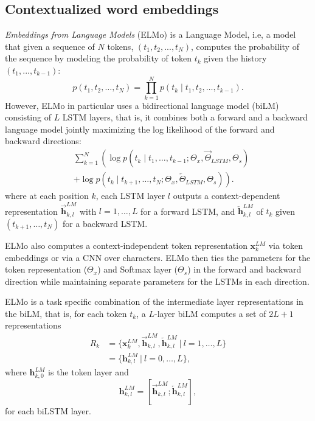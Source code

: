
\subsection{Contextualized word embeddings}

\emph{Embeddings from Language Models} (ELMo) \cite{peters-etal-2018-deep} is a Language Model, i.e, a model that given a sequence of $N$ tokens, $(t_1, t_2, ..., t_N)$, computes the probability of the sequence
by modeling the probability of token $t_k$ given the history $(t_1, ..., t_{k-1})$:
\[
    p(t_1, t_2, \ldots, t_N) = \prod_{k=1}^N p({t_k} \mid t_1, t_2, \ldots, t_{k-1}).
\]
However, ELMo in particular uses a bidirectional language model (biLM) consisting of $L$ LSTM layers, that is, it combines both a forward and a backward language model jointly maximizing the log likelihood of the forward and backward directions:
\begin{align*}
     & \sum_{k=1}^N \left( \right. \log p({t_k} \mid t_1, \ldots, t_{k-1}; \Theta_x, \overrightarrow{\Theta}_{LSTM}, \Theta_s) \\
     & + \log p({t_k} \mid t_{k+1}, \ldots, t_{N}; \Theta_x, \overleftarrow{\Theta}_{LSTM}, \Theta_s)
    \left. \right).
\end{align*}
where at each position $k$, each LSTM layer $l$ outputs a context-dependent representation $\overrightarrow{\mathbf{h}}^{LM}_{k,l}$ with $l=1, \ldots, L$ for a forward LSTM, and $\overleftarrow{\mathbf{h}}^{LM}_{k,l}$ of $t_k$ given $(t_{k+1}, \ldots, t_N)$ for a backward LSTM.

ELMo also computes a context-independent token representation $\mathbf{x}^{LM}_{k}$ via token embeddings or via a CNN over characters. ELMo then ties the parameters for the token representation ($\Theta_x$) and Softmax layer ($\Theta_s$) in the forward and backward direction while maintaining separate parameters for the LSTMs in each direction.

ELMo is a task specific combination of the intermediate layer representations in the biLM, that is,
for each token $t_k$, a $L$-layer biLM computes a set of $2L + 1$ representations
\begin{align*}
    R_k & =  \{\mathbf{x}^{LM}_{k}, \overrightarrow{\mathbf{h}}^{LM}_{k,l}, \overleftarrow{\mathbf{h}}^{LM}_{k,l} \ |\  l =1, \ldots, L \} \\
        & =  \{\mathbf{h}^{LM}_{k,l}\ | \ l=0, \ldots, L\},
\end{align*}
where $\mathbf{h}^{LM}_{k,0}$ is the token layer and
\[
    \mathbf{h}^{LM}_{k,l} = [\overrightarrow{\mathbf{h}}^{LM}_{k,l}; \overleftarrow{\mathbf{h}}^{LM}_{k,l}],
\]
for each biLSTM layer.


